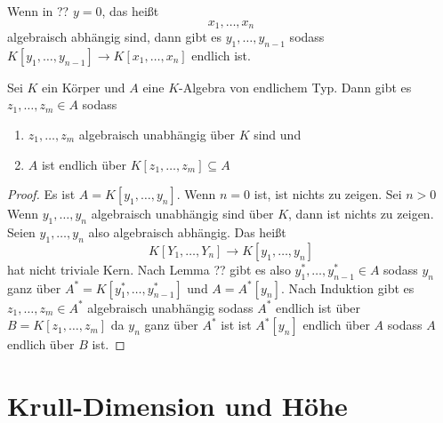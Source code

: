 \begin{Bem} Wenn in ?? \( y=0 \), das heißt \[x_1,\dots,x_n \] algebraisch abhängig sind, 
	dann gibt es \(y_1,\dots,y_{n-1}\) sodass \(K[y_1,\dots,y_{n-1}]\to K[x_1,\dots,x_n]\) endlich ist.
	
\end{Bem}
\begin{Satz}\label{Satz:NoetherNor}
	Sei \(K\) ein Körper und \(A\) eine \(K\)-Algebra von endlichem Typ. Dann gibt es \(z_1,\dots,z_m\in A\) sodass
	\begin{enumerate}
		\item \(z_1,\dots,z_m\) algebraisch unabhängig über \(K\) sind und
		\item \(A\) ist endlich über \(K[z_1,\dots,z_m]\subseteq A\)
	\end{enumerate}
\end{Satz}
\begin{proof}
	Es ist \(A=K[y_1,\dots,y_n]\). Wenn \(n=0\) ist, ist nichts zu zeigen.
	Sei \(n>0\) Wenn \(y_1,\dots,y_n\) algebraisch unabhängig sind über \(K\), dann ist nichts zu zeigen.
	Seien \(y_1,\dots,y_n\) also algebraisch abhängig. Das heißt \[K[Y_1,\dots,Y_n]\to K[y_1,\dots,y_n]\] hat nicht triviale Kern.
	Nach Lemma ?? gibt es also \(y_1^*,\dots,y_{n-1}^*\in A\) sodass \(y_n\) ganz über \(A^*=K[y_1^*,\dots,y_{n-1}^*]\) und \(A=A^*[y_n]\). Nach Induktion gibt es \(z_1,\dots,z_m\in A^*\) algebraisch unabhängig sodass \(A^*\) endlich ist über \(B=K[z_1,\dots,z_m]\) da \(y_n\) ganz über \(A^*\) ist ist \(A^*[y_n]\) endlich über \(A\) sodass \(A\) endlich über \(B\) ist.
\end{proof}
\section{Krull-Dimension und Höhe}

